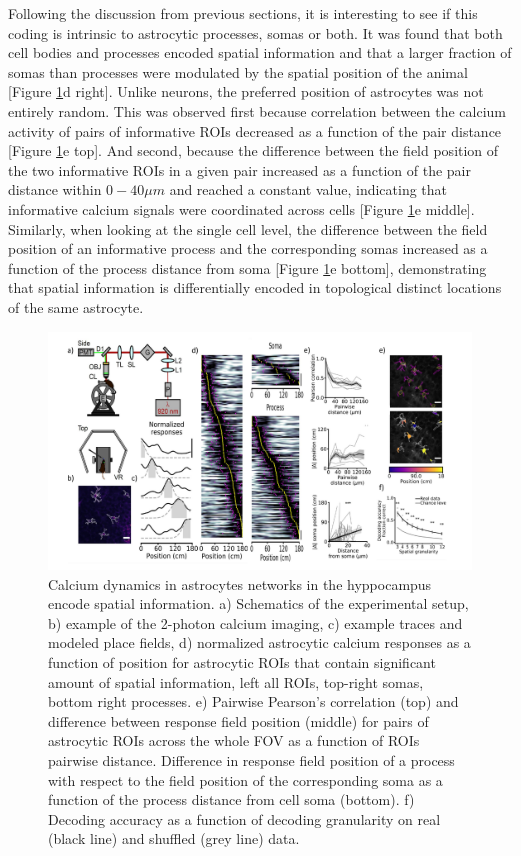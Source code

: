 Following the discussion from previous sections, it is interesting to see if this coding is intrinsic to astrocytic processes, somas or both. 
It was found that both cell bodies and processes encoded spatial information and that a larger fraction of somas than processes were modulated by the spatial position of the animal [Figure \ref{fig:chap1:sebapaper}d right].
Unlike neurons, the preferred position of astrocytes was not entirely random.
This was observed first because correlation between the calcium activity of pairs of informative ROIs decreased as a function of the pair distance [Figure \ref{fig:chap1:sebapaper}e top].
And second, because the difference between the field position of the two informative ROIs in a given pair increased as a function of the pair distance within $0-40 \mu m$ and reached a constant value, indicating that informative calcium signals were coordinated across cells [Figure \ref{fig:chap1:sebapaper}e middle].
Similarly, when looking at the single cell level, the difference between the field position of an informative process and the corresponding somas increased as a function of the process distance from soma [Figure \ref{fig:chap1:sebapaper}e bottom], demonstrating that spatial information is differentially encoded in topological distinct locations of the same astrocyte. 
\begin{figure}[t]
    \centering
    \includegraphics[width=\textwidth]{Figures/Chapter1/intro_fig_seba.pdf}
    \caption{Calcium dynamics in astrocytes networks in the hyppocampus encode spatial information. a) Schematics of the experimental setup, b) example of the 2-photon calcium imaging, c) example traces and modeled place fields, d) normalized astrocytic calcium responses as a function of position for astrocytic ROIs that contain significant amount of spatial information, left all ROIs, top-right somas, bottom right processes. e) Pairwise Pearson’s correlation (top) and difference between response field position (middle) for pairs of astrocytic ROIs across the whole FOV as a function of ROIs pairwise distance. Difference in response field position of a process with respect to the field position of the corresponding soma as a function of the process distance from cell soma (bottom). f) Decoding accuracy as a function of decoding granularity on real (black line) and shuffled (grey line) data.}
    \label{fig:chap1:sebapaper}
\end{figure}
